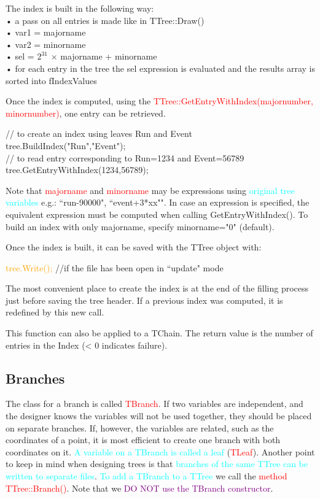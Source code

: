 \documentclass[12pt,a4paper]{article}
\begin{document}
The index is built in the following way: \\
• a pass on all entries is made like in TTree::Draw() \\
• var1 = majorname \\
• var2 = minorname \\
• sel = $2^{31}$ $\times$ majorname + minorname \\
• for each entry in the tree the sel expression is evaluated and the results array is sorted into fIndexValues

Once the index is computed, using the \textcolor{red}{TTree::GetEntryWithIndex(majornumber, minornumber)}, one entry can be retrieved.

// to create an index using leaves Run and Event \\
tree.BuildIndex("Run","Event"); \\
// to read entry corresponding to Run=1234 and Event=56789 \\
tree.GetEntryWithIndex(1234,56789); 

Note that \textcolor{red}{majorname} and \textcolor{red}{minorname} may be expressions using \textcolor{cyan}{original tree variables} e.g.: ``run-90000", ``event+3*xx"". In case an expression is specified, the equivalent expression must be computed when calling GetEntryWithIndex(). To build an index with only majorname, specify minorname="0" (default). 

Once the index is built, it can be saved with the TTree object with: 

\textcolor{orange}{tree.Write();} //if the file has been open in ``update" mode

The most convenient place to create the index is at the end of the filling process just before saving the tree header. If a previous index was computed, it is redefined by this new call.

This function can also be applied to a TChain. The return value is the number of entries in the Index (< 0 indicates failure).

\subsection{Branches}
The class for a branch is called \textcolor{red}{TBranch}. If two variables are independent, and the designer knows the variables will not be used together, they should be placed on separate branches. If, however, the variables are related, such as the coordinates of a point, it is most efficient to create one branch with both coordinates on it. \textcolor{cyan}{A variable on a TBranch is called a leaf} (\textcolor{red}{TLeaf}). Another point to keep in mind when designing trees is that \textcolor{cyan}{branches of the same TTree can be written to separate files}. \textcolor{cyan}{To add a TBranch to a TTree} we call the \textcolor{red}{method TTree::Branch()}. Note that we \textcolor{purple}{DO NOT use the TBranch constructor}.
\end{document}
